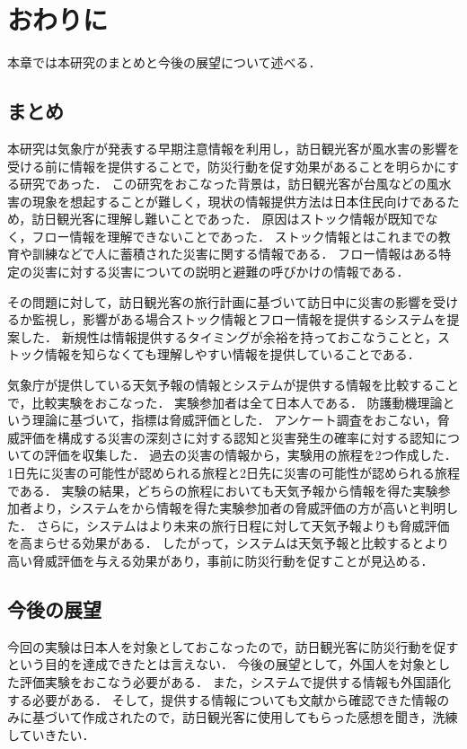 \documentclass[a4paper,11pt,oneside,openany]{jsbook}
\begin{document}
\chapter{おわりに}
本章では本研究のまとめと今後の展望について述べる．

\section{まとめ}
本研究は気象庁が発表する早期注意情報を利用し，訪日観光客が風水害の影響を受ける前に情報を提供することで，防災行動を促す効果があることを明らかにする研究であった．
この研究をおこなった背景は，訪日観光客が台風などの風水害の現象を想起することが難しく，現状の情報提供方法は日本住民向けであるため，訪日観光客に理解し難いことであった．
原因はストック情報が既知でなく，フロー情報を理解できないことであった．
ストック情報とはこれまでの教育や訓練などで人に蓄積された災害に関する情報である．
フロー情報はある特定の災害に対する災害についての説明と避難の呼びかけの情報である．

その問題に対して，訪日観光客の旅行計画に基づいて訪日中に災害の影響を受けるか監視し，影響がある場合ストック情報とフロー情報を提供するシステムを提案した．
新規性は情報提供するタイミングが余裕を持っておこなうことと，ストック情報を知らなくても理解しやすい情報を提供していることである．

気象庁が提供している天気予報の情報とシステムが提供する情報を比較することで，比較実験をおこなった．
実験参加者は全て日本人である．
防護動機理論という理論に基づいて，指標は脅威評価とした．
アンケート調査をおこない，脅威評価を構成する災害の深刻さに対する認知と災害発生の確率に対する認知についての評価を収集した．
過去の災害の情報から，実験用の旅程を2つ作成した．1日先に災害の可能性が認められる旅程と2日先に災害の可能性が認められる旅程である．
実験の結果，どちらの旅程においても天気予報から情報を得た実験参加者より，システムをから情報を得た実験参加者の脅威評価の方が高いと判明した．
さらに，システムはより未来の旅行日程に対して天気予報よりも脅威評価を高まらせる効果がある．
したがって，システムは天気予報と比較するとより高い脅威評価を与える効果があり，事前に防災行動を促すことが見込める．

\section{今後の展望}
今回の実験は日本人を対象としておこなったので，訪日観光客に防災行動を促すという目的を達成できたとは言えない．
今後の展望として，外国人を対象とした評価実験をおこなう必要がある．
また，システムで提供する情報も外国語化する必要がある．
そして，提供する情報についても文献から確認できた情報のみに基づいて作成されたので，訪日観光客に使用してもらった感想を聞き，洗練していきたい．
%
\end{document}
